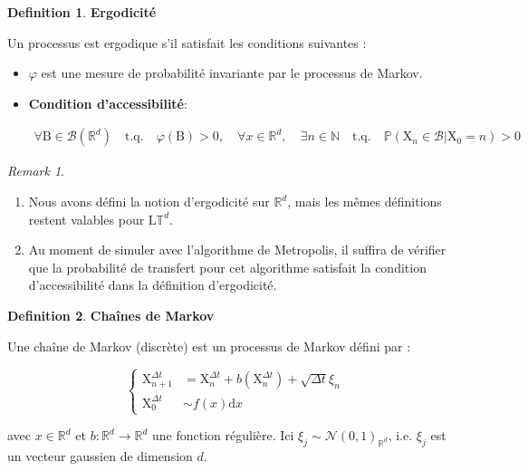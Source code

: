 \documentclass[11pt]{article}
\theoremstyle{definition}
\newtheorem{definition}{Definition}[section]
\theoremstyle{remark}
\newtheorem*{remark}{Remark}
\begin{document}
\begin{definition}{\textbf{Ergodicité}}

Un processus est ergodique s'il satisfait les conditions suivantes :

\begin{itemize}

\item 

$\varphi$ est une mesure de probabilité invariante par le processus de Markov. 

\item 

\textbf{Condition d'accessibilité}: 

\begin{align}
\forall \mathrm{B} \in \mathcal{B}(\mathbb{R}^d)\quad \mathrm{t.q.}\quad \varphi(\mathrm{B})>0, \quad \forall x\in\mathbb{R}^d, \quad \exists n\in\mathbb{N} \quad \mathrm{t.q.}\quad \mathbb{P}(\mathrm{X}_n \in \mathcal{B} | \mathrm{X}_0 =n ) > 0 
\end{align}
\end{itemize}

\end{definition}

\begin{remark}
\begin{enumerate}
\item 
Nous avons défini la notion d'ergodicité sur $\mathbb{R}^d$, mais les mêmes définitions restent valables pour $\mathrm{L}\mathbb{T}^d$.
\item 
Au moment de simuler avec l'algorithme de Metropolis, il suffira de vérifier que la probabilité de transfert pour cet algorithme satisfait la condition d'accessibilité dans la définition d'ergodicité.

\end{enumerate}
\end{remark}


\begin{definition}{\textbf{Chaînes de Markov}}

Une chaîne de Markov (discrète) est un processus de Markov défini par :

\begin{equation}
\left\{ 
  \begin{array}{ll}
  \mathrm{X}_{n+1}^{\Delta t} &= \mathrm{X}_{n}^{\Delta t} + b(\mathrm{X}_{n}^{\Delta t}) + \sqrt{\Delta t} \xi_{n}
  \\
  \mathrm{X}_{0}^{\Delta t} &\sim  f(x) \mathrm{d}x 
  \end{array}
\right.
\end{equation}



avec $x \in \mathbb{R}^d$ et $b: \mathbb{R}^d \to \mathbb{R}^d$ une fonction régulière. Ici $\xi_{j} \sim \mathcal{N}(0,1)_{\mathbb{R}^d}$, i.e. $\xi_{j}$ est un vecteur gaussien de dimension $d$. 
\end{definition}
\end{document}

